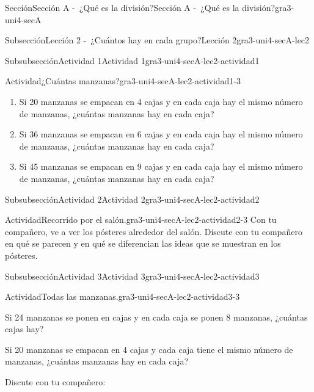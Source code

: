 \documentclass[twoside,10pt,]{article}
\begin{document}
\begin{sectionptx}{Sección}{Sección A -~¿Qué es la división?}{}{Sección A -~¿Qué es la división?}{}{}{gra3-uni4-secA}
\begin{subsectionptx}{Subsección}{Lección 2 -~¿Cuántos hay en cada grupo?}{}{Lección 2}{}{}{gra3-uni4-secA-lec2}
\begin{subsubsectionptx}{Subsubsección}{Actividad 1}{}{Actividad 1}{}{}{gra3-uni4-secA-lec2-actividad1}
\begin{activity}{Actividad}{¿Cuántas manzanas?}{gra3-uni4-secA-lec2-actividad1-3}
\begin{enumerate}
\item{}Si 20 manzanas se empacan en 4 cajas y en cada caja hay el mismo número de manzanas, ¿cuántas manzanas hay en cada caja?%
\item{}Si 36 manzanas se empacan en 6 cajas y en cada caja hay el mismo número de manzanas, ¿cuántas manzanas hay en cada caja?%
\item{}Si 45 manzanas se empacan en 9 cajas y en cada caja hay el mismo número de manzanas, ¿cuántas manzanas hay en cada caja?%
\end{enumerate}
%
\end{activity}%
\end{subsubsectionptx}
%
%
\typeout{************************************************}
\typeout{************************************************}
%
\begin{subsubsectionptx}{Subsubsección}{Actividad 2}{}{Actividad 2}{}{}{gra3-uni4-secA-lec2-actividad2}
\begin{activity}{Actividad}{Recorrido por el salón.}{gra3-uni4-secA-lec2-actividad2-3}%
Con tu compañero, ve a ver los pósteres alrededor del salón. Discute con tu compañero en qué se parecen y en qué se diferencian las ideas que se muestran en los pósteres.%
\end{activity}%
\end{subsubsectionptx}
%
%
\typeout{************************************************}
\typeout{************************************************}
%
\begin{subsubsectionptx}{Subsubsección}{Actividad 3}{}{Actividad 3}{}{}{gra3-uni4-secA-lec2-actividad3}
\begin{activity}{Actividad}{Todas las manzanas.}{gra3-uni4-secA-lec2-actividad3-3}%
\begin{sidebyside}{2}{0.05}{0.05}{0.1}%
\begin{sbspanel}{0.4}%
Si 24 manzanas se ponen en cajas y en cada caja se ponen 8 manzanas, ¿cuántas cajas hay?%
\end{sbspanel}%
\begin{sbspanel}{0.4}%
\par
Si 20 manzanas se empacan en 4 cajas y cada caja tiene el mismo número de manzanas, ¿cuántas manzanas hay en cada caja?%
\end{sbspanel}%
\end{sidebyside}%
\par
Discute con tu compañero:%
\par
%
\begin{itemize}[label=\textbullet]

\end{itemize}
\end{activity}
\end{subsubsectionptx}
\end{subsectionptx}
\end{sectionptx}
\end{document}

